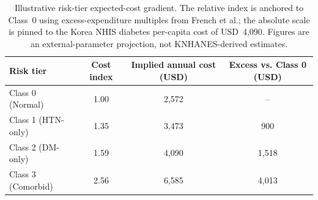 \begin{table}[ht]
\centering
\caption{Illustrative risk-tier expected-cost gradient. The relative index is anchored to Class~0 using excess-expenditure multiples from French et al.; the absolute scale is pinned to the Korea NHIS diabetes per-capita cost of USD~4{,}090. Figures are an external-parameter projection, not KNHANES-derived estimates.}
\label{tab:cost_gradient}
\begin{tabular}{lccc}
\toprule
Risk tier & Cost index & Implied annual cost (USD) & Excess vs. Class 0 (USD) \\
\midrule
  Class 0 (Normal) & 1.00 & 2,572 & -- \\
  Class 1 (HTN-only) & 1.35 & 3,473 & 900 \\
  Class 2 (DM-only) & 1.59 & 4,090 & 1,518 \\
  Class 3 (Comorbid) & 2.56 & 6,585 & 4,013 \\
\bottomrule
\end{tabular}
\end{table}